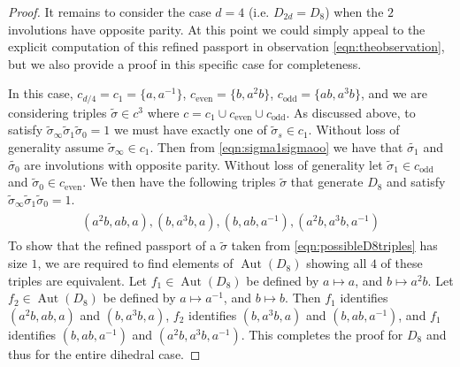 \documentclass{dcthesis}
\newcommand{\wt}[1]{\widetilde{#1}}
\DeclareMathOperator{\Aut}{Aut}
\numberwithin{equation}{section}
\theoremstyle{definition}
\theoremstyle{remark}
\begin{document}
{{{\begin{proof}
      \par
      It remains to consider the case
      $d=4$ (i.e. $D_{2d} = D_8$)
      when the $2$ involutions have
      opposite parity.
      At this point we could simply appeal
      to the explicit computation of
      this refined passport in observation
      \eqref{eqn:theobservation},
      but we also provide a proof in
      this specific case for completeness.
      \par
      In this case,
      $c_{d/4} = c_1=\{a,a^{-1}\}$,
      $c_\text{even}=\{b,a^2b\}$,
      $c_\text{odd}=\{ab,a^3b\}$,
      and we are considering triples
      $\wt{\sigma}\in
      c^3$
      where $c=c_1\cup c_\text{even}
      \cup c_\text{odd}$.
      As discussed above,
      to satisfy $\wt{\sigma}_\infty
      \wt{\sigma}_1\wt{\sigma}_0=1$
      we must have exactly one of
      $\wt{\sigma}_s\in c_1$.
      Without loss of generality assume
      $\wt{\sigma}_\infty\in c_1$.
      Then from \eqref{eqn:sigma1sigmaoo}
      we have that $\wt{\sigma_1}$
      and $\wt{\sigma_0}$ are involutions with
      opposite parity.
      Without loss of generality let
      $\wt{\sigma}_1\in c_\text{odd}$
      and $\wt{\sigma}_0\in c_\text{even}$.
      We then have the following triples
      $\wt{\sigma}$ that generate
      $D_8$ and satisfy
      $\wt{\sigma}_\infty\wt{\sigma}_1
      \wt{\sigma}_0=1$.
      \begin{align}
        \label{eqn:possibleD8triples}
        \begin{split}
          (a^2b,ab,a),
          (b,a^3b,a),
          (b,ab,a^{-1}),
          (a^2b,a^3b,a^{-1})
        \end{split}
      \end{align}
      To show that the refined passport
      of a $\wt{\sigma}$ taken from
      \eqref{eqn:possibleD8triples}
      has size $1$,
      we are required to find elements of
      $\Aut(D_8)$
      showing all $4$ of these triples are
      equivalent.
      Let $f_1\in\Aut(D_8)$ be defined by
      $a\mapsto a$, and
      $b\mapsto a^2b$.
      Let $f_2\in\Aut(D_8)$ be defined by
      $a\mapsto a^{-1}$, and
      $b\mapsto b$.
      Then $f_1$ identifies
      $(a^2b,ab,a)$
      and
      $(b,a^3b,a)$,
      $f_2$ identifies
      $(b,a^3b,a)$
      and
      $(b,ab,a^{-1})$,
      and
      $f_1$ identifies
      $(b,ab,a^{-1})$
      and
      $(a^2b,a^3b,a^{-1})$.
      This completes the proof for $D_8$
      and thus for the entire dihedral case.

\end{proof}}}}
\end{document}
